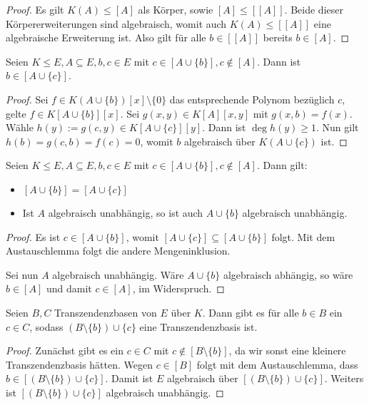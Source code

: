 \begin{proof}
    Es gilt $K(A) \leq [A]$ als Körper, sowie $[A] \leq [[A]]$. Beide dieser Körpererweiterungen sind algebraisch, womit auch $K(A) \leq [[A]]$ eine algebraische Erweiterung ist. Also gilt für alle $b \in [[A]]$ bereits $b \in [A]$.
\end{proof}

\begin{lemma}[Austauschlemma]
    Seien $K \leq E, A \subseteq E, b, c \in E$ mit $c \in [A \cup \{b\}], c \notin [A]$. Dann ist $b \in [A \cup \{c\}]$.
\end{lemma}

\begin{proof}
    Sei $f \in K(A \cup \{b\})[x] \setminus \{0\}$ das entsprechende Polynom bezüglich $c$, \obda gelte $f \in K[A \cup \{b\}][x]$. Sei $g(x,y) \in K[A][x,y]$ mit $g(x,b) = f(x)$. Wähle $h(y) := g(c, y) \in K[A \cup \{c\}][y]$. Dann ist $\deg h(y) \geq 1$. Nun gilt $h(b) = g(c,b) = f(c) = 0$, womit $b$ algebraisch über $K(A \cup \{ c \})$ ist.
\end{proof}

\begin{corollary}
    Seien $K \leq E, A \subseteq E, b, c \in E$ mit $c \in [A \cup \{b\}], c \notin [A]$. Dann gilt:
    \begin{itemize}
        \item $[A \cup \{b\}] = [A \cup \{c\}]$
        \item Ist $A$ algebraisch unabhängig, so ist auch $A \cup \{ b \}$ algebraisch unabhängig.
    \end{itemize}
\end{corollary}

\begin{proof}
    Es ist $c \in [A \cup \{b\}]$, womit $[A \cup \{c\}] \subseteq [A \cup \{b\}]$ folgt. Mit dem Austauschlemma folgt die andere Mengeninklusion.

    Sei nun $A$ algebraisch unabhängig. Wäre $A \cup \{ b \}$ algebraisch abhängig, so wäre $b \in [A]$ und damit $c \in [A]$, im Widerspruch.
\end{proof}

\begin{corollary}
    Seien $B, C$ Transzendenzbasen von $E$ über $K$. Dann gibt es für alle $b \in B$ ein $c \in C$, sodass $(B \setminus \{b\}) \cup \{c\}$ eine Transzendenzbasis ist.
\end{corollary}

\begin{proof}
    Zunächst gibt es ein $c \in C$ mit $c \notin [B \setminus \{b\}]$, da wir sonst eine kleinere Transzendenzbasis hätten. Wegen $c \in [B]$ folgt mit dem Austauschlemma, dass $b \in [(B \setminus \{b\}) \cup \{c\}]$. Damit ist $E$ algebraisch über $[(B \setminus \{b\}) \cup \{c\}]$. Weiters ist $[(B \setminus \{b\}) \cup \{c\}]$ algebraisch unabhängig.
\end{proof}

